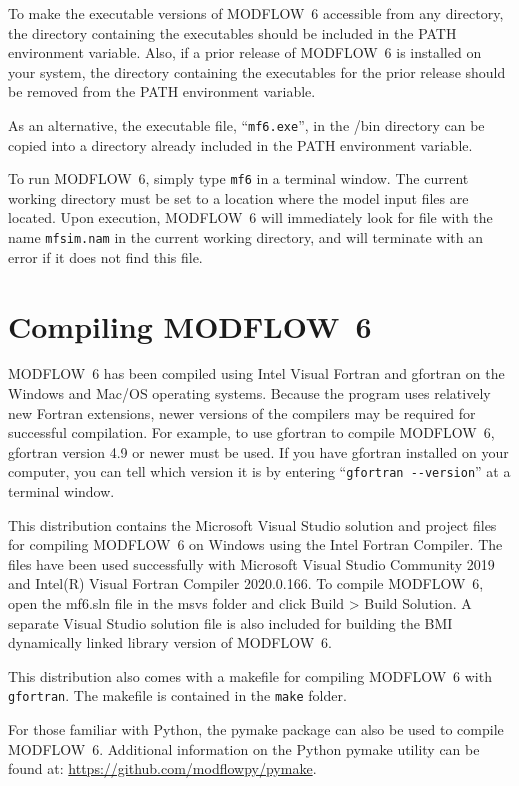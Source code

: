 \documentclass[11pt,twoside,twocolumn]{usgsreport}
\begin{document}
To make the executable versions of MODFLOW~6 accessible from any directory, the directory containing the executables should be included in the PATH environment variable.  Also, if a prior release of MODFLOW~6 is installed on your system, the directory containing the executables for the prior release should be removed from the PATH environment variable.

As an alternative, the executable file, ``\texttt{mf6.exe}'', in the \modflowversion{}/bin directory can be copied into a directory already included in the PATH environment variable.

To run MODFLOW~6, simply type \texttt{mf6} in a terminal window.  The current working directory must be set to a location where the model input files are located.  Upon execution, MODFLOW~6 will immediately look for file with the name \texttt{mfsim.nam} in the current working directory, and will terminate with an error if it does not find this file.

\section{Compiling MODFLOW~6}
MODFLOW~6 has been compiled using Intel Visual Fortran and gfortran on the Windows and Mac/OS operating systems.  Because the program uses relatively new Fortran extensions, newer versions of the compilers may be required for successful compilation.  For example, to use gfortran to compile MODFLOW~6, gfortran version 4.9 or newer must be used.  If you have gfortran installed on your computer, you can tell which version it is by entering ``\verb|gfortran --version|'' at a terminal window.

This distribution contains the Microsoft Visual Studio solution and project files for compiling MODFLOW~6 on Windows using the Intel Fortran Compiler.  The files have been used successfully with Microsoft Visual Studio Community 2019 and Intel(R) Visual Fortran Compiler 2020.0.166.  To compile MODFLOW~6, open the mf6.sln file in the msvs folder and click Build >  Build Solution.  A separate Visual Studio solution file is also included for building the BMI dynamically linked library version of MODFLOW~6.

This distribution also comes with a makefile for compiling MODFLOW~6 with \texttt{gfortran}.  The makefile is contained in the \texttt{make} folder.

For those familiar with Python, the pymake package can also be used to compile MODFLOW~6.  Additional information on the Python pymake utility can be found at: \url{https://github.com/modflowpy/pymake}.  
\end{document}
